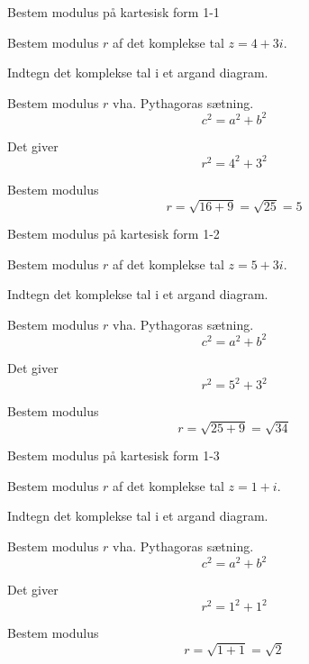 \documentclass{article}
\begin{document}
\tableofcontents
\newpage

\begin{exercise}{Bestem modulus på kartesisk form 1-1}

Bestem modulus $r$ af det komplekse tal $z=4+3i$.



\hint 

Indtegn det komplekse tal i et argand diagram.


\hint

Bestem modulus $r$ vha. Pythagoras sætning.
\[
c^2 = a^2 + b^2
\]

\hint 

Det giver
\[
r^2 = 4^2 + 3^2
\]

\hint

Bestem modulus
\[
 r  = \sqrt{16+9} = \sqrt{25} = 5
\]



\end{exercise}

\newpage

\begin{exercise}{Bestem modulus på kartesisk form 1-2}
	
	Bestem modulus $r$ af det komplekse tal $z=5+3i$.
	
	
	
	\hint 
	
	Indtegn det komplekse tal i et argand diagram.
	
	
	\hint
	
	Bestem modulus $r$ vha. Pythagoras sætning.
	\[
	c^2 = a^2 + b^2
	\]
	
	\hint 
	
	Det giver
	\[
	r^2 = 5^2 + 3^2
	\]
	
	\hint
	
	Bestem modulus
	\[
	r  = \sqrt{25+9} = \sqrt{34} 
	\]
	
	
	
\end{exercise}


\newpage

\begin{exercise}{Bestem modulus på kartesisk form 1-3}
	
	Bestem modulus $r$ af det komplekse tal $z=1+i$.
	
	
	
	\hint 
	
	Indtegn det komplekse tal i et argand diagram.
	
	
	\hint
	
	Bestem modulus $r$ vha. Pythagoras sætning.
	\[
	c^2 = a^2 + b^2
	\]
	
	\hint 
	
	Det giver
	\[
	r^2 = 1^2 + 1^2
	\]
	
	\hint
	
	Bestem modulus
	\[
	r  = \sqrt{1+1} = \sqrt{2} 
	\]
	
	
	
\end{exercise}
\end{document}
